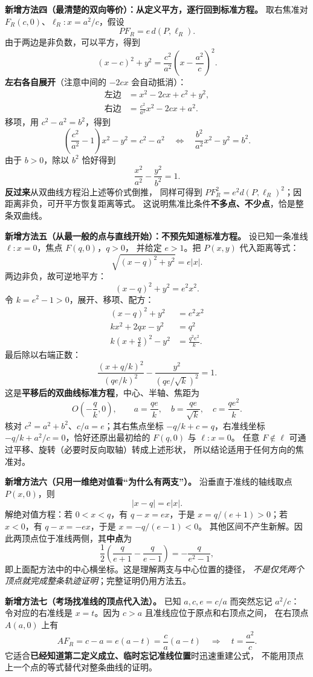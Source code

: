 \clearpage
\begin{proofbox}
\textbf{新增方法四（最清楚的双向等价）：从定义平方，逐行回到标准方程。}
取右焦准对 $F_R(c,0)$、$\ell_R:x=a^2/c$，假设
\[
PF_R=e\,d(P,\ell_R).
\]
由于两边是非负数，可以平方，得到
\[
(x-c)^2+y^2=\frac{c^2}{a^2}\left(x-\frac{a^2}{c}\right)^2.
\]
\textbf{左右各自展开}（注意中间的 $-2cx$ 会自动抵消）：
\[
\begin{aligned}
\text{左边}&=x^2-2cx+c^2+y^2,\\
\text{右边}&=\frac{c^2}{a^2}x^2-2cx+a^2.
\end{aligned}
\]
移项，用 $c^2-a^2=b^2$，得到
\[
\left(\frac{c^2}{a^2}-1\right)x^2-y^2=c^2-a^2
\quad\Longleftrightarrow\quad
\frac{b^2}{a^2}x^2-y^2=b^2.
\]
由于 $b>0$，除以 $b^2$ 恰好得到
\[
\boxed{\frac{x^2}{a^2}-\frac{y^2}{b^2}=1}.
\]
\textbf{反过来}从双曲线方程沿上述等价式倒推，
同样可得到 $PF_R^2=e^2d(P,\ell_R)^2$；因距离非负，可开平方恢复距离等式。
这说明焦准比条件\textbf{不多点、不少点}，恰是整条双曲线。
\medskip
\end{proofbox}
\clearpage
\begin{proofbox}
\medskip
\textbf{新增方法五（从最一般的点与直线开始）：不预先知道标准方程。}
设已知一条准线 $\ell:x=0$，焦点 $F(q,0)$，$q>0$，
并给定 $e>1$。把 $P(x,y)$ 代入距离等式：
\[
\sqrt{(x-q)^2+y^2}=e|x|.
\]
两边非负，故可逆地平方：
\[
(x-q)^2+y^2=e^2x^2.
\]
令 $k=e^2-1>0$，展开、移项、配方：
\[
\begin{aligned}
(x-q)^2+y^2&=e^2x^2\\
kx^2+2qx-y^2&=q^2\\
k\left(x+\frac qk\right)^2-y^2&=\frac{q^2e^2}{k}.
\end{aligned}
\]
最后除以右端正数：
\[
\boxed{\frac{\left(x+q/k\right)^2}{\left(qe/k\right)^2}
-\frac{y^2}{\left(qe/\sqrt{k}\right)^2}=1}.
\]
这是\textbf{平移后的双曲线标准方程}，中心、半轴、焦距为
\[
O\left(-\frac qk,0\right),\qquad
 a=\frac{qe}{k},\quad b=\frac{qe}{\sqrt{k}},\quad
 c=\frac{qe^2}{k}.
\]
核对 $c^2=a^2+b^2$、$c/a=e$；其右焦点坐标
$-q/k+c=q$，右准线坐标 $-q/k+a^2/c=0$，恰好还原出最初给的
$F(q,0)$ 与 $\ell:x=0$。
任意 $F\notin\ell$ 可通过平移、旋转（必要时反向取轴）转成上述形状，
所以结论适用于任何方向的焦准对。
\end{proofbox}
\clearpage
\begin{proofbox}
\textbf{新增方法六（只用一维绝对值看“为什么有两支”）。}
沿垂直于准线的轴线取点 $P(x,0)$，则
\[
|x-q|=e|x|.
\]
解绝对值方程：若 $0<x<q$，有 $q-x=ex$，于是
$x=q/(e+1)>0$；若 $x<0$，有 $q-x=-ex$，于是
$x=-q/(e-1)<0$。
其他区间不产生新解。因此两顶点位于准线两侧，其\textbf{中点}为
\[
\frac12\left(\frac{q}{e+1}-\frac{q}{e-1}\right)
=-\frac{q}{e^2-1},
\]
即上面配方法中的中心横坐标。这是理解两支与中心位置的捷径，
\emph{不是仅凭两个顶点就完成整条轨迹证明}；完整证明仍用方法五。
\end{proofbox}
\clearpage
\begin{proofbox}
\textbf{新增方法七（考场找准线的顶点代入法）。}
已知 $a,c,e=c/a$ 而突然忘记 $a^2/c$：
令对应的右准线是 $x=t$。因为 $c>a$ 且准线应位于原点和右顶点之间，
在右顶点 $A(a,0)$ 上有
\[
AF_R=c-a=e(a-t)=\frac ca(a-t)
\quad\Longrightarrow\quad
\boxed{t=\frac{a^2}{c}}.
\]
它适合\textbf{已经知道第二定义成立、临时忘记准线位置}时迅速重建公式，
不能用顶点上一个点的等式替代对整条曲线的证明。
\end{proofbox}
